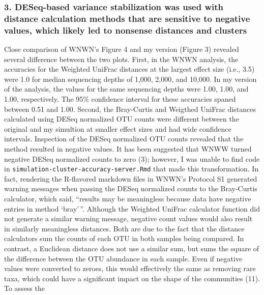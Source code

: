 \documentclass[
]{article}
\begin{document}
\hypertarget{deseq-based-variance-stabilization-was-used-with-distance-calculation-methods-that-are-sensitive-to-negative-values-which-likely-led-to-nonsense-distances-and-clusters}{%
\subsubsection{3. DESeq-based variance stabilization was used with
distance calculation methods that are sensitive to negative values,
which likely led to nonsense distances and
clusters}\label{deseq-based-variance-stabilization-was-used-with-distance-calculation-methods-that-are-sensitive-to-negative-values-which-likely-led-to-nonsense-distances-and-clusters}}

Close comparison of WNWN's Figure 4 and my version (Figure 3) revealed
several difference between the two plots. First, in the WNWN analysis,
the accuracies for the Weighted UniFrac distances at the largest effect
size (i.e., 3.5) were 1.0 for median sequencing depths of 1,000, 2,000,
and 10,000. In my version of the analysis, the values for the same
sequencing depths were 1.00, 1.00, and 1.00, respectively. The 95\%
confidence interval for these accuracies spaned between 0.51 and 1.00.
Second, the Bray-Curtis and Weigthed UniFrac distances calculated using
DESeq normalized OTU counts were different between the original and my
simultion at smaller effect sizes and had wide confidence intervals.
Inspection of the DESeq normalized OTU counts revealed that the method
resulted in negative values. It has been suggested that WNWW turned
negative DESeq normalized counts to zero (3); however, I was unable to
find code in \texttt{simulation-cluster-accuracy-server.Rmd} that made
this transformation. In fact, rendering the R-flavored markdown files in
WNWN's Protocol S1 generated warning messages when passing the DESeq
normalized counts to the Bray-Curtis calculator, which said, ``results
may be meaningless because data have negative entries in method
`bray'\,''. Although the Weighted UniFrac calculator function did not
generate a similar warning message, negative count values would also
result in similarly meaningless distances. Both are due to the fact that
the distance calculators sum the counts of each OTU in both samples
being compared. In contrast, a Euclidean distance does not use a similar
sum, but sums the square of the difference between the OTU abundance in
each sample. Even if negative values were converted to zeroes, this
would effectively the same as removing rare taxa, which could have a
significant impact on the shape of the communities (11). To assess the
\end{document}
